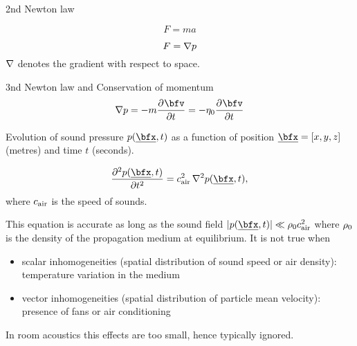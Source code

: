2nd Newton law

\begin{equation}
    F = m a
\end{equation}

\begin{equation}
    F = \mathop{}\!\mathbin{\nabla}{}{p}
\end{equation}
$\mathop{}\!\mathbin{\nabla}{}$ denotes the gradient with respect to space.

3nd Newton law and Conservation of momentum
\begin{equation}
    \kgrad{\pressure} = - \mass \kpderiv[]{\bfv}{t} = - \volumeUnit \kpderiv[]{\bfv}{t}
\end{equation}


Evolution of sound pressure $\pressure (\positionMicrophone, t)$
as a function of position $\positionMicrophone = \klist{x, y, z}$ (metres) and time $t$ (seconds).

\begin{equation}
    \label{eq:acoustics:wave}
    \kpderiv[2]{\pressure(\positionMicrophone, t)}{t} = \cair^2 \knabla^2 \pressure(\positionMicrophone, t)
    ,
\end{equation}
where $c_\text{air}$ is the speed of sounds.

This equation is accurate as long as the sound field $\abs{\pressure(\positionMicrophone, t)} \ll \densityEq \cair^2$
where $\rho_0$ is the density of the propagation medium at equilibrium. It is not true when
\begin{itemize}
    \item scalar inhomogeneities (spatial distribution of sound speed or air density): temperature variation in the medium
    \item vector inhomogeneities (spatial distribution of particle mean velocity): presence of fans or air conditioning
\end{itemize}
In room acoustics this effects are too small, hence typically ignored.

